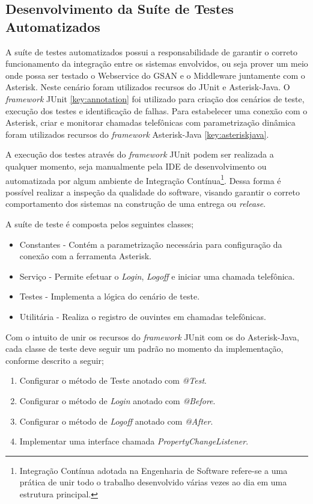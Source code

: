 \subsection{Desenvolvimento da Suíte de Testes Automatizados}

A suíte de testes automatizados possui a responsabilidade de garantir o correto funcionamento da integração entre os sistemas envolvidos, ou seja prover um meio onde possa ser testado o Webservice do GSAN e o Middleware juntamente com o Asterisk. 
Neste cenário foram utilizados recursos do JUnit e Asterisk-Java. O \textit{framework} JUnit \ref{key:annotation} foi utilizado para criação dos cenários de teste, execução dos testes e identificação de falhas. Para estabelecer uma conexão com o Asterisk, criar e monitorar chamadas telefônicas com parametrização dinâmica foram utilizados recursos do \textit{framework} Asterisk-Java \ref{key:asteriskjava}.  

A execução dos testes através do \textit{framework} JUnit podem ser realizada a qualquer momento, seja manualmente pela IDE de desenvolvimento ou automatizada por algum ambiente de Integração Contínua\footnote{Integração Contínua adotada na Engenharia de Software refere-se a uma prática de unir todo o trabalho desenvolvido várias vezes ao dia em uma estrutura principal.}. Dessa forma é possível realizar a inspeção da qualidade do software, visando garantir o correto comportamento dos sistemas na construção de uma entrega ou \textit{release}.

A suíte de teste é composta pelos seguintes classes;
\begin{itemize}
	\item Constantes - Contém a parametrização necessária para configuração da conexão com a ferramenta Asterisk.
	\item Serviço - Permite efetuar o \textit{Login}, \textit{Logoff} e iniciar uma chamada telefônica.
	\item Testes - Implementa a lógica do cenário de teste.
	\item Utilitária - Realiza o registro de ouvintes em chamadas telefônicas.
\end{itemize}


Com o intuito de unir os recursos do \textit{framework} JUnit com os do Asterisk-Java, cada classe de teste deve seguir um padrão no momento da implementação, conforme descrito a seguir;

\begin{enumerate}
	\item Configurar o método de Teste anotado com \textit{@Test}.
	\item Configurar o método de \textit{Login} anotado com \textit{@Before}.
	\item Configurar o método de \textit{Logoff} anotado com \textit{@After}.
	\item Implementar uma interface chamada \textit{PropertyChangeListener}.	
\end{enumerate}

